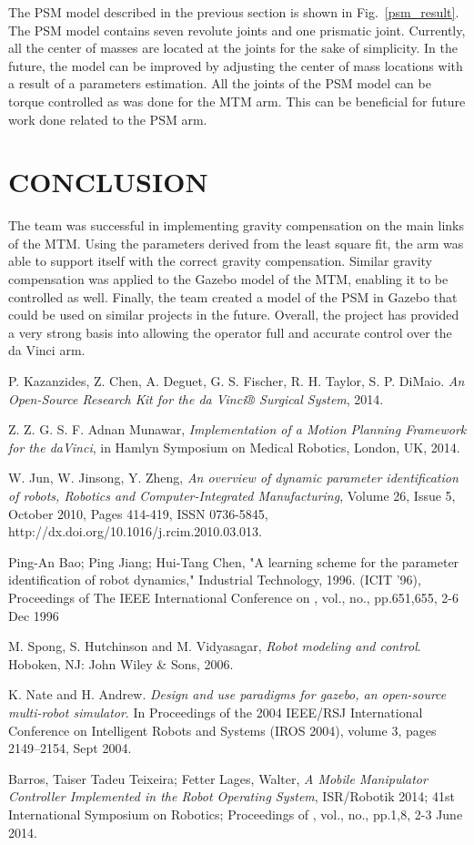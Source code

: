 \documentclass[conference]{IEEEtran}
\begin{document}
The PSM model described in the previous section is shown in Fig.~\ref{psm_result}. The PSM model contains seven revolute joints and one prismatic joint. Currently, all the center of masses are located at the joints for the sake of simplicity. In the future, the model can be improved by adjusting the center of mass locations with a result of a parameters estimation. All the joints of the PSM model can be torque controlled as was done for the MTM arm. This can be beneficial for future work done related to the PSM arm.


\section{CONCLUSION}
The team was successful in implementing gravity compensation on the main links of the MTM. Using the parameters derived from the least square fit, the arm was able to support itself with the correct gravity compensation. Similar gravity compensation was applied to the Gazebo model of the MTM, enabling it to be controlled as well. Finally, the team created a model of the PSM in Gazebo that could be used on similar projects in the future. Overall, the project has provided a very strong basis into allowing the operator full and accurate control over the da Vinci arm.


\begin{thebibliography}{1}

P. Kazanzides, Z. Chen, A. Deguet, G. S. Fischer, R. H. Taylor, S. P. DiMaio. \emph{An Open-Source Research Kit for the da Vinci® Surgical System}, 2014.

Z. Z. G. S. F. Adnan Munawar, \emph{Implementation of a Motion Planning Framework for the daVinci}, in Hamlyn Symposium on Medical Robotics, London, UK, 2014.

W. Jun, W. Jinsong, Y. Zheng, \emph{An overview of dynamic parameter identification of robots, Robotics and Computer-Integrated Manufacturing}, Volume 26, Issue 5, October 2010, Pages 414-419, ISSN 0736-5845, http://dx.doi.org/10.1016/j.rcim.2010.03.013.

Ping-An Bao; Ping Jiang; Hui-Tang Chen, "A learning scheme for the parameter identification of robot dynamics," Industrial Technology, 1996. (ICIT '96), Proceedings of The IEEE International Conference on , vol., no., pp.651,655, 2-6 Dec 1996

M. Spong, S. Hutchinson and M. Vidyasagar, \emph{Robot modeling and control}. Hoboken, NJ: John Wiley \& Sons, 2006.


K. Nate and H. Andrew. \emph{Design and use paradigms for gazebo, an open-source multi-robot simulator}. In Proceedings of the 2004 IEEE/RSJ International Conference on Intelligent Robots and Systems (IROS 2004), volume 3, pages 2149–2154, Sept 2004.

Barros, Taiser Tadeu Teixeira; Fetter Lages, Walter, \emph{A Mobile Manipulator Controller Implemented in the Robot Operating System}, ISR/Robotik 2014; 41st International Symposium on Robotics; Proceedings of , vol., no., pp.1,8, 2-3 June 2014.

\end{thebibliography}
\end{document}
